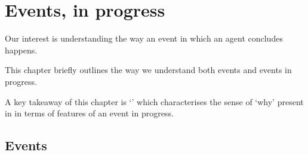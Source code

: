 \chapter{Events, in progress}
\label{cha:events-progress}


\begin{note}
  Our interest is understanding the way an event in which an agent concludes happens.

  This chapter briefly outlines the way we understand both events and events in progress.

  A key takeaway of this chapter is `\progEx{}' which characterises the sense of `why' present in \qWhy{} in terms of features of an event in progress.
\end{note}


\section{Events}
\label{sec:events}

